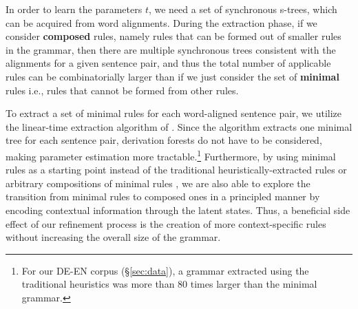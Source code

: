 \documentclass[11pt]{article}
\begin{document}
In order to learn the parameters $t$, we need a set of synchronous s-trees, which can be acquired from word alignments.  
During the extraction phase, if we consider {\bf composed} rules, namely rules that can be formed out of smaller rules in the grammar, then there are multiple synchronous trees consistent with the alignments for a given sentence pair, and thus the total number of applicable rules can be combinatorially larger than if we just consider the set of {\bf minimal} rules i.e., rules that cannot be formed from other rules. 

To extract a set of minimal rules for each word-aligned sentence pair, we utilize the linear-time extraction algorithm of .  
Since the algorithm extracts one minimal tree for each sentence pair, derivation forests do not have to be considered, making parameter estimation more tractable.\footnote{For our \textsc{DE-EN} corpus (\S\ref{sec:data}), a grammar extracted using the traditional heuristics was more than 80 times larger than the minimal grammar.} 
Furthermore, by using minimal rules as a starting point instead of the traditional heuristically-extracted rules \cite{Chiang2005} or arbitrary compositions of minimal rules \cite{Galley2006}, we are also able to explore the transition from minimal rules to composed ones in a principled manner by encoding contextual information through the latent states.   
Thus, a beneficial side effect of our refinement process is the creation of more context-specific rules without increasing the overall size of the grammar.
\end{document}
